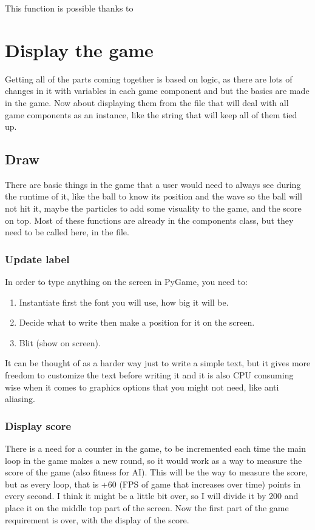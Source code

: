 This function is possible thanks to \cite{Particles_-_Pygame_Tutorial}

\section{Display the game}\label{display-the-game}
Getting all of the parts coming together is based on logic, as there are lots of changes in it with variables in each game component  and  but the basics are made in the game. Now about displaying them from the  file that will deal with all game components as an instance, like the string that will keep all of them tied up.

\subsection{Draw}\label{draw}
There are basic things in the game that a user would need to always see during the runtime of it, like the ball to know its position and the wave so the ball will not hit it, maybe the particles to add some visuality to the game, and the score on top. Most of these functions are already in the components class, but they need to be called here, in the  file.

\subsubsection{Update label}

In order to type anything on the screen in PyGame, you need to:
\begin{enumerate}
	\item Instantiate first the font you will use, how big it will be.
	\item Decide what to write then make a position for it on the screen.
	\item Blit (show on screen).
\end{enumerate}

It can be thought of as a harder way just to write a simple text, but it gives more freedom to customize the text before writing it and it is also CPU consuming wise when it comes to graphics options that you might not need, like anti aliasing.

\subsubsection{Display score} \label{display-score}
There is a need for a counter in the game, to be incremented each time the main  loop in the game makes a new round, so it would work as a way to measure the score of the game (also fitness for AI). This  will be the way to measure the score, but as every loop, that is +60 (FPS of game that increases over time) points in every second. I think it might be a little bit over, so I will divide it by 200 and place it on the middle top part of the screen. Now the first part of the game requirement is over, with the display of the score.


